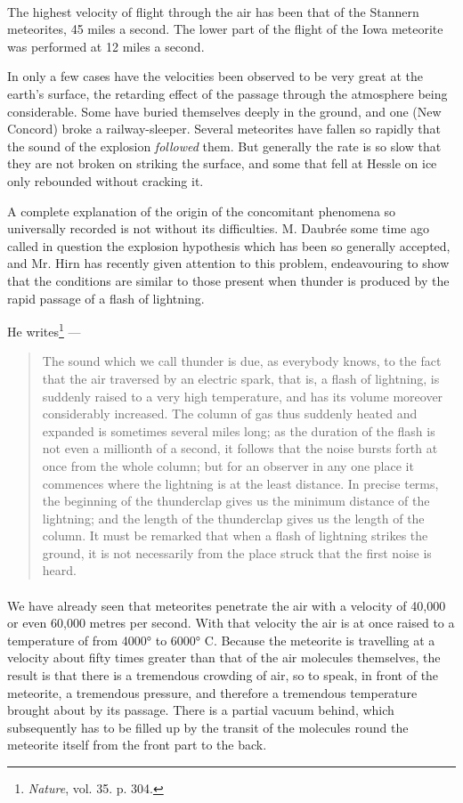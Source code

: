 \documentclass[a4paper, 12pt, oneside, polutonikogreek, english]{article}
\begin{document}
\paragraph{}
The highest velocity of flight through the air has been that of the Stannern meteorites, 45 miles a second. The lower part of the flight of the Iowa meteorite was performed at 12 miles a second.

In only a few cases have the velocities been observed to be very great at the earth's surface, the retarding effect of the passage through the atmosphere being considerable. Some have buried themselves deeply in the ground, and one (New Concord) broke a railway-sleeper. Several meteorites have fallen so rapidly that the sound of the explosion \emph{followed} them. But generally the rate is so slow that they are not broken on striking the surface, and some that fell at Hessle on ice only rebounded without cracking it.

A complete explanation of the origin of the concomitant phenomena so universally recorded is not without its difficulties. M. Daubrée some time ago called in question the explosion hypothesis which has been so generally accepted, and Mr. Hirn has recently given attention to this problem, endeavouring to show that the conditions are similar to those present when thunder is produced by the rapid passage of a flash of lightning.

He writes\footnote{\emph{Nature}, vol. 35. p. 304.} ---
\begin{quotation}
The sound which we call thunder is due, as everybody knows, to the fact that the air traversed by an electric spark, that is, a flash of lightning, is suddenly raised to a very high temperature, and has its volume moreover considerably increased. The column of gas thus suddenly heated and expanded is sometimes several miles long; as the duration of the flash is not even a millionth of a second, it follows that the noise bursts forth at once from the whole column; but for an observer in any one place it commences where the lightning is at the least distance. In precise terms, the beginning of the thunderclap gives us the minimum distance of the lightning; and the length of the thunderclap gives us the length of the column. It must be remarked that when a flash of lightning strikes the ground, it is not necessarily from the place struck that the first noise is heard.
\end{quotation}
\paragraph{}
We have already seen that meteorites penetrate the air with a velocity of 40,000 or even 60,000 metres per second. With that velocity the air is at once raised to a temperature of from 4000° to 6000° C. Because the meteorite is travelling at a velocity about fifty times greater than that of the air molecules themselves, the result is that there is a tremendous crowding of air, so to speak, in front of the meteorite, a tremendous pressure, and therefore a tremendous temperature brought about by its passage. There is a partial vacuum behind, which subsequently has to be filled up by the transit of the molecules round the meteorite itself from the front part to the back.
\end{document}
